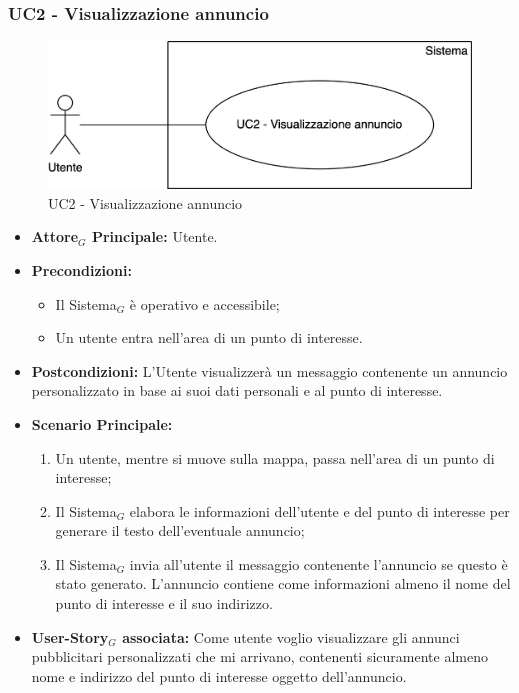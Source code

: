 \documentclass[10pt]{article}
\begin{document}
\begin{justify}
\subsubsection{\textbf{UC2 - Visualizzazione annuncio}}
\begin{figure}[H]
    \centering
    \includegraphics[width=0.7\linewidth]{UC2image.png}
    \caption{UC2 - Visualizzazione annuncio}
    \label{fig:UC2}
\end{figure}
\begin{itemize}
    \item \textbf{Attore$_G$ Principale:} Utente.
    \item \textbf{Precondizioni:} 
        \begin{itemize}
    	\item Il Sistema$_G$ è operativo e accessibile;
    	\item Un utente entra nell'area di un punto di interesse.
        \end{itemize}
    \item \textbf{Postcondizioni:} L'Utente visualizzerà un messaggio contenente un annuncio personalizzato in base ai suoi dati personali e al punto di interesse.
    \item \textbf{Scenario Principale:} 
        \begin{enumerate}
            \item Un utente, mentre si muove sulla mappa, passa nell'area di un punto di interesse;
            \item Il Sistema$_G$ elabora le informazioni dell'utente e del punto di interesse per generare il testo dell'eventuale annuncio;
            \item Il Sistema$_G$ invia all'utente il messaggio contenente l'annuncio se questo è stato generato. L'annuncio contiene come informazioni almeno il nome del punto di interesse e il suo indirizzo.
        \end{enumerate}
    \item \textbf{User-Story$_G$ associata:} Come utente voglio visualizzare gli annunci pubblicitari personalizzati che mi arrivano, contenenti sicuramente almeno nome e indirizzo del punto di interesse oggetto dell'annuncio.
\end{itemize}

\end{justify}
\end{document}
